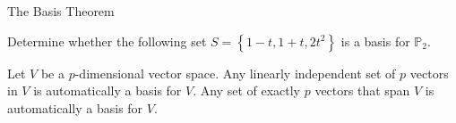\documentclass[xcolor=dvipsnames,aspectratio=169,t]{beamer}
\begin{document}
\begin{frame}{The Basis Theorem}

  \begin{example}
  Determine whether the following set $S = \left\{ 1-t , 1+t, 2t^2 \right\}$ is a basis for $\mathbb{P}_2$.
  \end{example}
  \vspace*{2em}

  \pause
  \begin{theorem}
  Let $V$ be a $p$-dimensional vector space. Any linearly independent set of $p$ vectors in $V$ is automatically a basis for $V$. Any set of exactly $p$ vectors that span $V$ is automatically a basis for $V$.
  \end{theorem}

\end{frame}
\end{document}
